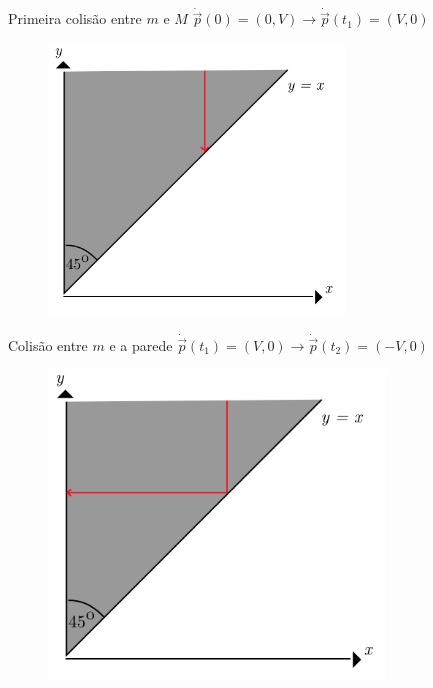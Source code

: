\documentclass{beamer}
\begin{document}
\begin{frame}{Primeira colisão entre $m$ e $M$}
  $\dot{\vec{p}}(0)=(0,V)\to\dot{\vec{p}}(t_1)=(V,0)$
  \begin{figure}
    \centering
    \includegraphics[width=0.7\textwidth]{images/image1-2.png}
  \end{figure}
\end{frame}

\begin{frame}{Colisão entre $m$ e a parede}
  $\dot{\vec{p}}(t_1)=(V,0)\to\dot{\vec{p}}(t_2)=(-V,0)$
  \begin{figure}
    \centering
    \includegraphics[width=0.8\textwidth]{images/image1-3.png}
  \end{figure}
\end{frame}
\end{document}
